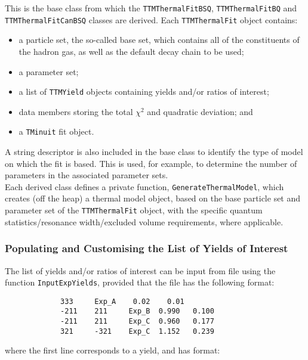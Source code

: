 \documentclass{elsarticle}
\begin{document}
This is the base class from which the \texttt{TTMThermalFitBSQ}, \texttt{TTMThermalFitBQ} and \texttt{TTMThermalFitCanBSQ} classes are derived. Each \texttt{TTMThermalFit} object contains:
\begin{itemize}
\item{a particle set, the so-called base set, which contains all of the constituents of the hadron gas, as 
well as the default decay chain to be used;} 
\item{a parameter set;} 
\item{a list of \texttt{TTMYield} objects containing yields and/or ratios of interest;}
\item{data members storing the total $\chi^2$ and quadratic deviation; and} 
\item{a \texttt{TMinuit} fit object.}
\end{itemize}

A string descriptor is also included in the base class to 
identify the type of model on which the fit is based. This is used, for 
example, to determine the number of parameters in the associated 
parameter sets.\\ 

Each derived class defines a private function, \texttt{GenerateThermalModel}, which creates 
(off the heap) a thermal model object, based on the base particle set and parameter set of 
the \texttt{TTMThermalFit} object, with the specific quantum statistics/resonance width/excluded 
volume requirements, where applicable.\\

\subsubsection{Populating and Customising the List of Yields of Interest}
The list of yields and/or ratios of interest can be input from file using 
the function 
\texttt{InputExpYields}, provided that the file has the following format:

\small
\begin{verbatim}
             333     Exp_A    0.02    0.01
             -211    211     Exp_B  0.990   0.100
             -211    211     Exp_C  0.960   0.177
             321     -321    Exp_C  1.152   0.239
\end{verbatim}
\normalsize

\noindent
where the first line corresponds to a yield, and has format:\\
\end{document}
